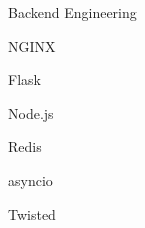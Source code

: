 \begin{skillset}{Backend Engineering}
  \item NGINX
  \item Flask
  \item Node.js
  \item Redis
  \item asyncio
  \item Twisted
\end{skillset}
